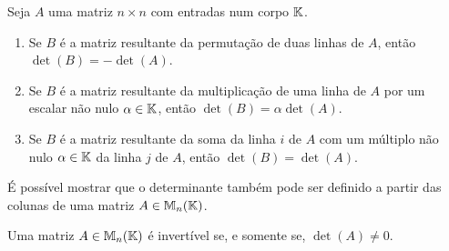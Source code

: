 \begin{proposicao}
    Seja $A$ uma matriz $n \times n$ com entradas num corpo $\mathbb{K}$.
    \begin{enumerate}[label={\roman*})]
        \item Se $B$ é a matriz resultante da permutação de duas linhas de $A$, então $\det (B) = -\det (A)$.
        \item Se $B$ é a matriz resultante da multiplicação de uma linha de $A$ por um escalar não nulo $\alpha \in \mathbb{K}$, então
            $\det(B) = \alpha\det(A)$.
        \item Se $B$ é a matriz resultante da soma da linha $i$ de $A$ com um múltiplo não nulo $\alpha \in \mathbb{K}$ da linha $j$ de
            $A$, então $\det(B) = \det(A)$.
    \end{enumerate}
\end{proposicao}

\begin{observacao}
    É possível mostrar que o determinante também pode ser definido a partir das colunas de uma matriz $A \in \mathbb{M}_n(\mathbb{K})$.
\end{observacao}

\begin{teorema}
    Uma matriz $A \in \mathbb{M}_n(\mathbb{K})$ é invertível se, e somente se, $\det(A) \ne 0$.
\end{teorema}

